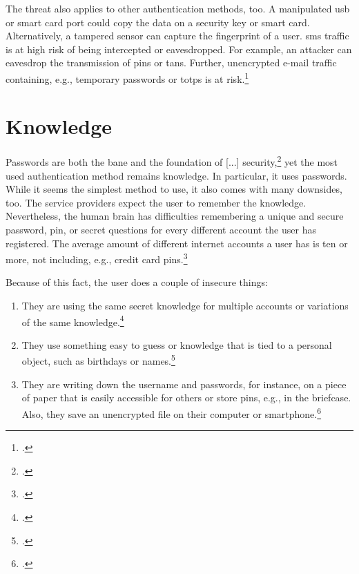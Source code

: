 The threat also applies to other authentication methods, too. A manipulated \gls{usb} or smart card port could copy the data on a security key or smart card. Alternatively, a tampered sensor can capture the fingerprint of a user. \gls{sms} traffic is at high risk of being intercepted or eavesdropped. For example, an attacker can eavesdrop the transmission of \glspl{pin} or \glspl{tan}. Further, unencrypted e-mail traffic containing, e.g., temporary passwords or \glspl{totp} is at risk.\footcites[See][103]{2241278}[See][58]{dotson2019practical}[See][6]{Mayes2017}


\section{Knowledge}

\frqq Passwords are both the bane and the foundation of [...] security\flqq{},\footcite[206]{517355} yet the most used authentication method remains knowledge. In particular, \gls{it} uses passwords. While it seems the simplest method to use, it also comes with many downsides, too. The service providers expect the user to remember the knowledge. Nevertheless, the human brain has difficulties remembering a unique and secure password, \gls{pin}, or secret questions for every different account the user has registered. The average amount of different internet accounts a user has is ten or more, not including, e.g., credit card \glspl{pin}.\footcites[See][7, 9]{lastpass}[See][424]{doi:10.1002/9781118256107.ch37}

Because of this fact, the user does a couple of insecure things:

\begin{enumerate}[label=(\alph*)]
	\item They are using the same secret knowledge for multiple accounts or variations of the same knowledge.\footcites[See][8]{yougov}[See][14]{sweden-passwords}[See][7]{lastpass}
	\item They use something easy to guess or knowledge that is tied to a personal object, such as birthdays or names.\footcites[See][]{web-de-passwords}[See][34]{anderson2008security}
	\item They are writing down the username and passwords, for instance, on a piece of paper that is easily accessible for others or store \glspl{pin}, e.g., in the briefcase. Also, they save an unencrypted file on their computer or smartphone.\footcites[See][]{web-de-passwords}[See][6]{yougov2}

\end{enumerate}

